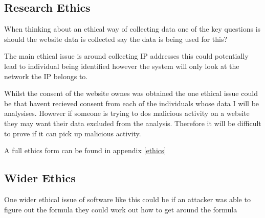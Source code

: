 \subsection{Research Ethics}

When thinking about an ethical way of collecting data one of the key questions is should the website data is collected say the data is being used for this?

The main ethical issue is around collecting IP addresses this could potentially lead to individual being identified however the system will only look at the network the IP belongs to. 

Whilst the  consent of the website ownes was  obtained the one ethical issue could be that  havent recieved consent from each of the individuals whose data I will be analysises. However if someone is trying to dos malicious activity on a website they may want their data excluded from the analysis. Therefore it will be difficult to prove if it can pick up malicious activity.

A full ethics  form can be found in appendix \ref{ethics}

\subsection{Wider Ethics}

One wider ethical issue of software like this could be if an attacker was able to figure out the formula they could work out how to get around the formula